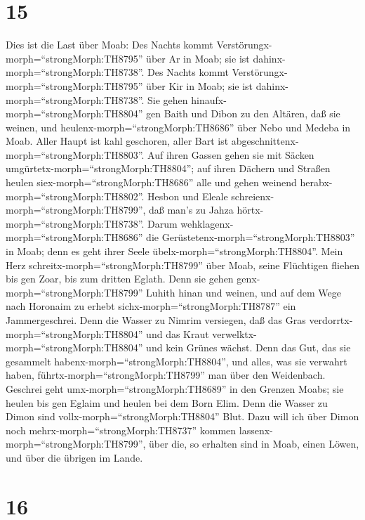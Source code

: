 \hypertarget{section-14}{%
\section{15}\label{section-14}}

 Dies ist die Last über Moab: Des Nachts kommt
Verstörungx-morph=``strongMorph:TH8795'' über Ar in Moab; sie ist
dahinx-morph=``strongMorph:TH8738''. Des Nachts kommt
Verstörungx-morph=``strongMorph:TH8795'' über Kir in Moab; sie ist
dahinx-morph=``strongMorph:TH8738''.  Sie gehen
hinaufx-morph=``strongMorph:TH8804'' gen Baith und Dibon zu den Altären,
daß sie weinen, und heulenx-morph=``strongMorph:TH8686'' über Nebo und
Medeba in Moab. Aller Haupt ist kahl geschoren, aller Bart ist
abgeschnittenx-morph=``strongMorph:TH8803''.  Auf ihren
Gassen gehen sie mit Säcken umgürtetx-morph=``strongMorph:TH8804''; auf
ihren Dächern und Straßen heulen siex-morph=``strongMorph:TH8686'' alle
und gehen weinend herabx-morph=``strongMorph:TH8802''. 
Hesbon und Eleale schreienx-morph=``strongMorph:TH8799'', daß man's zu
Jahza hörtx-morph=``strongMorph:TH8738''. Darum
wehklagenx-morph=``strongMorph:TH8686'' die
Gerüstetenx-morph=``strongMorph:TH8803'' in Moab; denn es geht ihrer
Seele übelx-morph=``strongMorph:TH8804''.  Mein Herz
schreitx-morph=``strongMorph:TH8799'' über Moab, seine Flüchtigen
fliehen bis gen Zoar, bis zum dritten Eglath. Denn sie gehen
genx-morph=``strongMorph:TH8799'' Luhith hinan und weinen, und auf dem
Wege nach Horonaim zu erhebt sichx-morph=``strongMorph:TH8787'' ein
Jammergeschrei.  Denn die Wasser zu Nimrim versiegen, daß
das Gras verdorrtx-morph=``strongMorph:TH8804'' und das Kraut
verwelktx-morph=``strongMorph:TH8804'' und kein Grünes wächst.
 Denn das Gut, das sie gesammelt
habenx-morph=``strongMorph:TH8804'', und alles, was sie verwahrt haben,
führtx-morph=``strongMorph:TH8799'' man über den Weidenbach.
 Geschrei geht umx-morph=``strongMorph:TH8689'' in den
Grenzen Moabs; sie heulen bis gen Eglaim und heulen bei dem Born Elim.
 Denn die Wasser zu Dimon sind
vollx-morph=``strongMorph:TH8804'' Blut. Dazu will ich über Dimon noch
mehrx-morph=``strongMorph:TH8737'' kommen
lassenx-morph=``strongMorph:TH8799'', über die, so erhalten sind in
Moab, einen Löwen, und über die übrigen im Lande.

\hypertarget{section-15}{%
\section{16}\label{section-15}}

